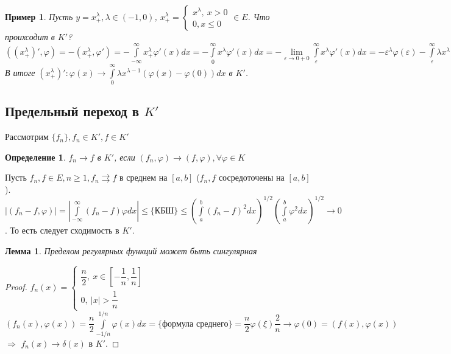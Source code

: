 \documentclass[9pt, a4paper]{article}
\newtheorem*{lemma}{Лемма}
\newtheorem*{definition}{Определение}
\newtheorem*{sample}{Пример}
\begin{document}
			\begin{sample}
				Пусть $y = x_+^\lambda, \lambda \in (-1, 0)$, $x_+^\lambda = \begin{cases}
					x^\lambda, \ x > 0 \\
					0, x \leq 0
				\end{cases}	 \in E $. Что проихсодит в $K'$? \newline
				$((x_+^\lambda)', \varphi) = - (x_+^\lambda, \varphi') = - \int\limits_{-\infty}^{\infty} x_+^\lambda \varphi'(x) dx = - \int\limits_0^\infty x^\lambda \varphi'(x) dx = -\lim\limits_{\varepsilon \to 0 +0} \int\limits_{\varepsilon}^{\infty} x^\lambda \varphi'(x) dx =  -\varepsilon^\lambda \varphi(\varepsilon) - \int\limits_{\varepsilon}^{\infty} \lambda x^{\lambda -1} \varphi(x) dx =  -\varepsilon^\lambda \varphi(\varepsilon) - \int\limits_{\varepsilon}^{\infty} \lambda x^{\lambda -1} (\varphi(x) - \varphi(0)) dx - \int\limits_{\varepsilon}^{\infty} \lambda x^{\lambda -1} \varphi(0) dx = \varepsilon^\lambda (\varphi(0) - \varphi(\varepsilon)) - \int\limits_{\varepsilon}^{\infty} \lambda x^{\lambda -1} (\varphi(x) - \varphi(0))dx \to - \int\limits_0^\infty \lambda x^{\lambda -1} (\varphi(x) - \varphi(0))dx$\newline
				В итоге $(x_+^\lambda)': \varphi(x) \to \int\limits_0^\infty \lambda x^{\lambda -1} (\varphi(x) - \varphi(0))dx$ в $K'$.
			\end{sample}
		\subsection{Предельный переход в $K'$}
			Рассмотрим $\{f_n\}, f_n \in K', f \in K'$
			\begin{definition}
				$f_n \to f$ в  $K'$, если $(f_n, \varphi) \to (f, \varphi), \forall \varphi \in K$
			\end{definition}
			Пусть $f_n, f \in E, n \geq 1, f_n \rightrightarrows f$ в среднем на $[a,b]$ ($f_n,f$ сосредоточены на $[a,b]$). $|(f_n-f, \varphi)| = |\int\limits_{-\infty}^{\infty} (f_n-f)\varphi dx | \leq \{\text{КБШ}\} \leq \left(\int\limits_a^b (f_n-f)^2dx\right)^{1/2} \left(\int\limits_a^b \varphi^2 dx\right)^{1/2} \to 0$. То есть следует сходимость в $K'$.
			\begin{lemma}
				Пределом регулярных функций может быть сингулярная		
			\end{lemma}
			\begin{proof}
				$f_n(x) = \begin{cases}
					\dfrac{n}{2}, \ x \in [-\dfrac{1}{n}, \dfrac{1}{n}]\\
					0, \ |x| > \dfrac{1}{n}
				\end{cases}$\newline
				$(f_n(x), \varphi(x)) = \dfrac{n}{2} \int\limits_{-1/n}^{1/n} \varphi(x)dx = \{\text{формула среднего}\} = \dfrac{n}{2} \varphi(\xi) \dfrac{2}{n} \to \varphi(0) = (f(x), \varphi(x)) $ $\Rightarrow$  $f_n(x) \to \delta(x)$ в $K'$.
			\end{proof}
\end{document}
